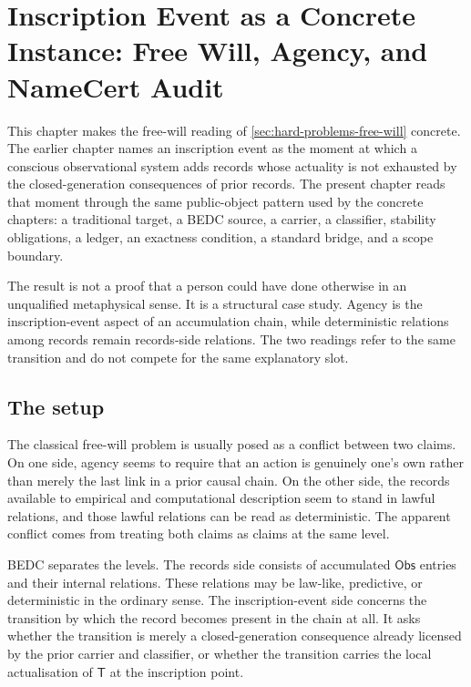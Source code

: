 \chapter{Inscription Event as a Concrete Instance: Free Will, Agency, and NameCert Audit}
\label{ch:visions-inscription-event-as-concrete-instance}

This chapter makes the free-will reading of
\autoref{sec:hard-problems-free-will} concrete.  The earlier chapter names an
inscription event as the moment at which a conscious observational system
adds records whose actuality is not exhausted by the closed-generation
consequences of prior records.  The present chapter reads that moment through
the same public-object pattern used by the concrete \NameCert{} chapters: a
traditional target, a BEDC source, a carrier, a classifier, stability
obligations, a ledger, an exactness condition, a standard bridge, and a
scope boundary.

The result is not a proof that a person could have done otherwise in an
unqualified metaphysical sense.  It is a structural case study.  Agency is
the inscription-event aspect of an accumulation chain, while deterministic
relations among records remain records-side relations.  The two readings
refer to the same transition and do not compete for the same explanatory
slot.

\section{The setup}
\label{sec:inscription-event-setup}

The classical free-will problem is usually posed as a conflict between two
claims.  On one side, agency seems to require that an action is genuinely
one's own rather than merely the last link in a prior causal chain.  On the
other side, the records available to empirical and computational description
seem to stand in lawful relations, and those lawful relations can be read as
deterministic.  The apparent conflict comes from treating both claims as
claims at the same level.

BEDC separates the levels.  The records side consists of accumulated
$\mathsf{Obs}$ entries and their internal relations.  These relations may be
law-like, predictive, or deterministic in the ordinary sense.  The
inscription-event side concerns the transition by which the record becomes
present in the chain at all.  It asks whether the transition is merely a
closed-generation consequence already licensed by the prior carrier and
classifier, or whether the transition carries the local actualisation of
$\mathsf{T}$ at the inscription point.

